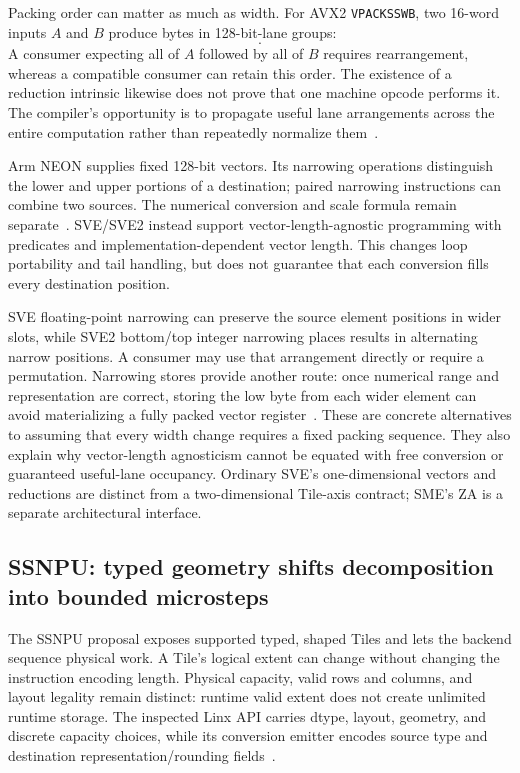 Packing order can matter as much as width. For AVX2 \texttt{VPACKSSWB}, two 16-word inputs $A$ and $B$ produce bytes in 128-bit-lane groups:
\begin{equation}
 [A_0\ldots A_7,\;B_0\ldots B_7,\;A_8\ldots A_{15},\;B_8\ldots B_{15}].
 \label{eq:u003_avx_pack}
\end{equation}
A consumer expecting all of $A$ followed by all of $B$ requires rearrangement, whereas a compatible consumer can retain this order. The existence of a reduction intrinsic likewise does not prove that one machine opcode performs it. The compiler's opportunity is to propagate useful lane arrangements across the entire computation rather than repeatedly normalize them~\citep{u003_intel_permute}.

Arm NEON supplies fixed 128-bit vectors. Its narrowing operations distinguish the lower and upper portions of a destination; paired narrowing instructions can combine two sources. The numerical conversion and scale formula remain separate~\citep{u003_arm_neon}. SVE/SVE2 instead support vector-length-agnostic programming with predicates and implementation-dependent vector length. This changes loop portability and tail handling, but does not guarantee that each conversion fills every destination position.

SVE floating-point narrowing can preserve the source element positions in wider slots, while SVE2 bottom/top integer narrowing places results in alternating narrow positions. A consumer may use that arrangement directly or require a permutation. Narrowing stores provide another route: once numerical range and representation are correct, storing the low byte from each wider element can avoid materializing a fully packed vector register~\citep{u003_arm_sve_examples,u003_arm_acle}. These are concrete alternatives to assuming that every width change requires a fixed packing sequence. They also explain why vector-length agnosticism cannot be equated with free conversion or guaranteed useful-lane occupancy. Ordinary SVE's one-dimensional vectors and reductions are distinct from a two-dimensional Tile-axis contract; SME's ZA is a separate architectural interface.

\subsection{SSNPU: typed geometry shifts decomposition into bounded microsteps}

The SSNPU proposal exposes supported typed, shaped Tiles and lets the backend sequence physical work. A Tile's logical extent can change without changing the instruction encoding length. Physical capacity, valid rows and columns, and layout legality remain distinct: runtime valid extent does not create unlimited runtime storage. The inspected Linx API carries dtype, layout, geometry, and discrete capacity choices, while its conversion emitter encodes source type and destination representation/rounding fields~\citep{u003_linx_geometry,u003_linx_emit}.

